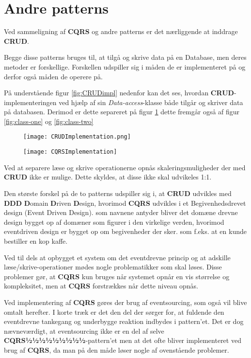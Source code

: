 \section{Andre patterns}
Ved sammeligning af \textbf{CQRS} og andre patterns er det nærliggende at inddrage \textbf{CRUD}.

Begge disse patterns bruges til, at tilgå og skrive data på en Database, men deres metoder er forskellige. Forskellen udspiller sig i måden de er implementeret på og derfor også måden de operere på.\newline

På understående figur \ref{fig:CRUDimpl} nedenfor kan det ses, hvordan \textbf{CRUD}-implementeringen ved hjælp af sin \textit{Data-access}-klasse både tilgår og skriver data på databasen. Derimod er dette separeret på figur \ref{fig:CQRSimpl} dette fremgår også af figur \ref{fig:class-one} og \ref{fig:class-two}

\begin{figure}[H]
	\centering
	\begin{minipage}{.5\textwidth}
		\centering
		\texttt{[image: CRUDImplementation.png]}
		\label{fig:CRUDimpl}
	\end{minipage}%
	\begin{minipage}{.5\textwidth}
		\centering
		\texttt{[image: CQRSImplementation]}
		\label{fig:CQRSimpl}
	\end{minipage}
\end{figure}


Ved at separere læse og skrive operationerne opnås skaleringsmuligheder der med \textbf{CRUD} ikke er mulige. Dette skyldes, at disse ikke skal udvikeles 1:1.\newline

Den største forskel på de to patterns udspiller sig i, at \textbf{CRUD} udvikles med \textbf{DDD} \textbf{D}omain \textbf{D}riven \textbf{D}esign, hvorimod \textbf{CQRS} udvikles i et Begivenhedsdrevet design (Event Driven Design). som navnene antyder bliver det domæne drevne design bygget op af domæner som figurer i den virkelige verden, hvorimod eventdriven design er bygget op om begivenheder der sker. som f.eks. at en kunde bestiller en kop kaffe.

Ved til dels at opbygget et system om det eventdrevne princip og at adskille læse/skrive-operationer mødes nogle problematikker som skal løses. Disse problemer gør, at \textbf{CQRS} kun bruges når systemet opnår en vis størrelse og kompleksitet, men at \textbf{CQRS} forstrækkes når dette niveau opnås.\newline

Ved implementering af \textbf{CQRS} gøres der brug af eventsourcing, som også vil blive omtalt herefter. I korte træk er det den del der sørger for, at fuldende den eventdrevne tankegang og underbygge reaktion indbydes i pattern'et.
Det er dog nævneværdigt, at eventsourcing ikke er en del af selve \textbf{CQRS½½½½½½½½½}-pattern'et men at det ofte bliver implementeret ved brug af \textbf{CQRS}, da man på den måde løser nogle af ovenstående problemer.

